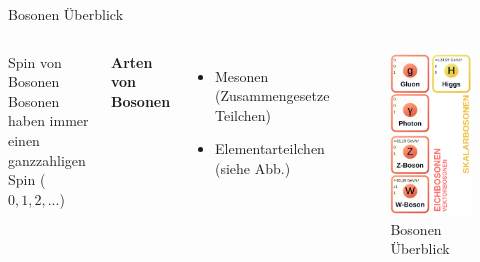 \documentclass[aspectratio=169,xcolor=dvipsnames]{beamer}
\begin{document}
\begin{frame}{Bosonen Überblick}
    \begin{columns}[c]
        \begin{block}{Spin von Bosonen}
            Bosonen haben immer einen ganzzahligen Spin ($0, 1, 2, ...$) %
        \end{block}
        \vspace{20pt}
        \textbf{Arten von Bosonen}
        \begin{itemize}
            \item Mesonen (Zusammengesetze Teilchen) %
            \item Elementarteilchen (siehe Abb.)
        \end{itemize}

        \begin{figure}
            \centering
            \includegraphics[width=0.45\linewidth]{figures/bosonen.png}
            \caption{Bosonen Überblick}
            \label{fig:bosonen}
        \end{figure}
    \end{columns}
\end{frame}
\end{document}
